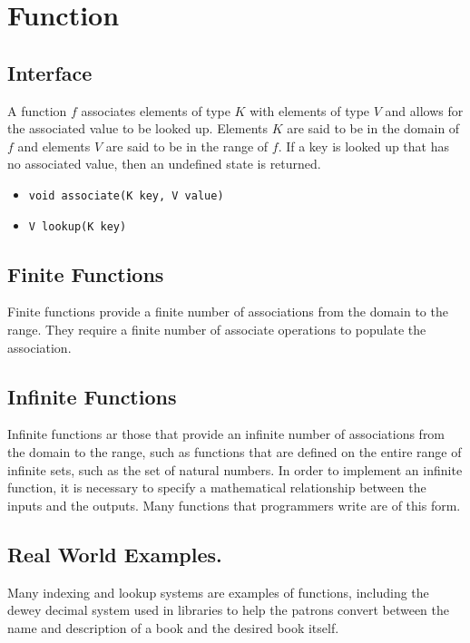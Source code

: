 \documentclass[12pt, letterpaper]{book}
\begin{document}
\section{Function}
	\subsection{Interface}

A function $f$ associates elements of type $K$ with elements of type $V$ and allows for the associated value to be looked up. Elements $K$ are said to be in the domain of $f$ and elements $V$ are said to be in the range of $f$. If a key is looked up that has no associated value, then an undefined state is returned.
\begin{itemize}
\item \texttt{void associate(K key, V value)}
\item \texttt{V lookup(K key)}
\end{itemize}

	\subsection{Finite Functions}

Finite functions provide a finite number of associations from the domain to the range. They require a finite number of associate operations to populate the association.

	\subsection{Infinite Functions}

Infinite functions ar those that provide an infinite number of associations from the domain to the range, such as functions that are defined on the entire range of infinite sets, such as the set of natural numbers. In order to implement an infinite function, it is necessary to specify a mathematical relationship between the inputs and the outputs. Many functions that programmers write are of this form.

	\subsection{Real World Examples.}

Many indexing and lookup systems are examples of functions, including the dewey decimal system used in libraries to help the patrons convert between the name and description of a book and the desired book itself.
\end{document}
